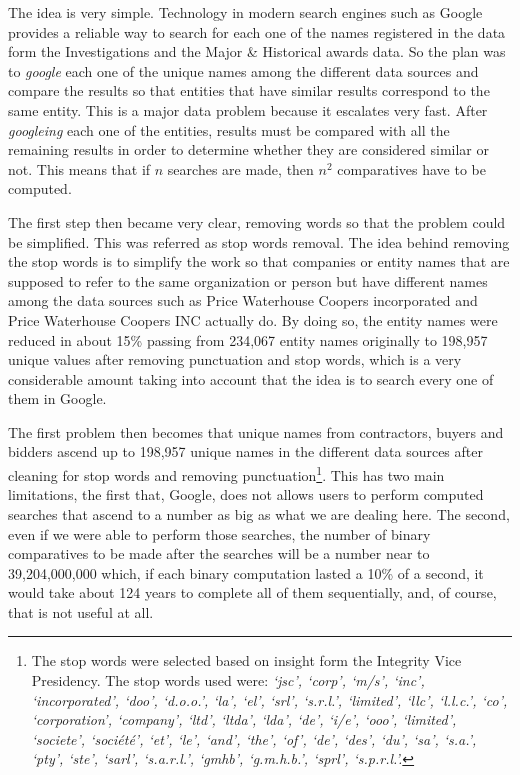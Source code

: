 The idea is very simple. Technology in modern search engines such as Google provides a reliable way to search for each one of the names registered in the data form the Investigations and the Major \& Historical awards data. So the plan was to \textit{google} each one of the unique names among the different data sources and compare the results so that entities that have similar results correspond to the same entity. This is a major data problem because it escalates very fast. After \textit{googleing} each one of the entities, results must be compared with all the remaining results in order to determine whether they are considered similar or not.  This means that if $n$ searches are made, then $n^2$ comparatives have to be computed. 

The first step then became very clear, removing words so that the problem could be simplified. This was referred as stop words removal. The idea behind removing the stop words is to simplify the work so that companies or entity names that are supposed to refer to the same organization or person but have different names among the data sources such as Price Waterhouse Coopers incorporated and Price Waterhouse Coopers INC actually do. By doing so, the entity names were reduced in about 15\% passing from 234,067 entity names originally to 198,957 unique values after removing punctuation and stop words, which is a very considerable amount taking into account that the idea is to search every one of them in Google.

The first problem then becomes that unique names from contractors, buyers and bidders ascend up to 198,957 unique names in the different data sources after cleaning for stop words and removing punctuation\footnote{The stop words were selected based on insight form the Integrity Vice Presidency. The stop words used were: \textit{`jsc', `corp', `m/s', `inc', `incorporated', `doo', `d.o.o.', `la', `el', `srl', `s.r.l.', `limited', `llc', `l.l.c.', `co', `corporation', `company', `ltd', `ltda', `lda', `de', `i/e', `ooo', `limited', `societe', `société', `et', `le', `and', `the', `of', `de', `des', `du', `sa', `s.a.', `pty', `ste', `sarl', `s.a.r.l.', `gmhb', `g.m.h.b.', `sprl', `s.p.r.l.'.} }. This has two main limitations, the first that, Google, does not allows users to perform computed searches that ascend to a number as big as what we are dealing here. The second, even if we were able to perform those searches, the number of binary comparatives to be made after the searches will be a number near to 39,204,000,000 which, if each binary computation lasted a 10\% of a second, it would take about 124 years to complete all of them sequentially, and,  of course, that is not useful at all.

